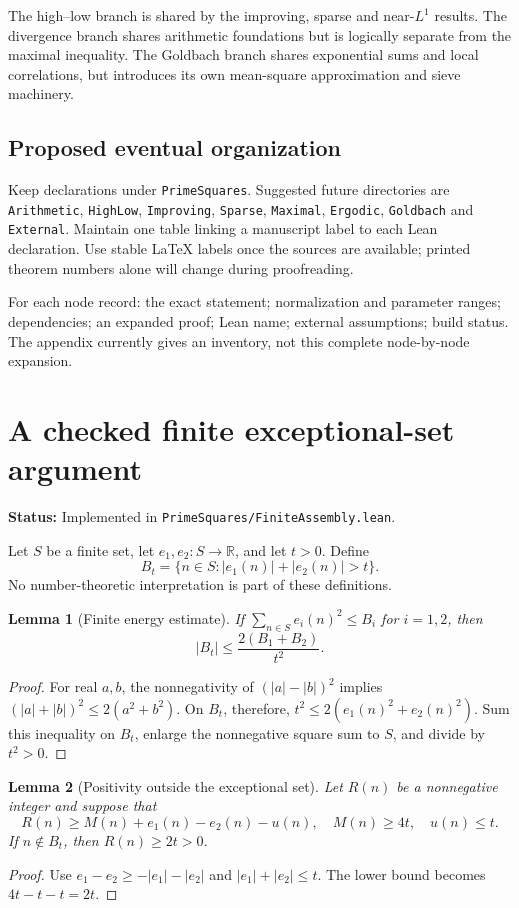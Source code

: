 \documentclass[11pt]{article}
\newcommand{\R}{\mathbb R}\newcommand{\Z}{\mathbb Z}\newcommand{\N}{\mathbb N}
\newcommand{\lean}[1]{\nolinkurl{#1}}
\newcommand{\status}[1]{\textbf{Status:} #1.}
\newtheorem{lemma}{Lemma}[section]
\newcommand{\page}{\newpage}
\begin{document}
The high--low branch is shared by the improving, sparse and near-\(L^1\) results.
The divergence branch shares arithmetic foundations but is logically separate from
the maximal inequality. The Goldbach branch shares exponential sums and local
correlations, but introduces its own mean-square approximation and sieve machinery.

\subsection*{Proposed eventual organization}
Keep declarations under \lean{PrimeSquares}. Suggested future directories are
\lean{Arithmetic}, \lean{HighLow}, \lean{Improving}, \lean{Sparse},
\lean{Maximal}, \lean{Ergodic}, \lean{Goldbach} and \lean{External}.
Maintain one table linking a manuscript label to each Lean declaration. Use stable
LaTeX labels once the sources are available; printed theorem numbers alone will
change during proofreading.

For each node record: the exact statement; normalization and parameter ranges;
dependencies; an expanded proof; Lean name; external assumptions; build status.
The appendix currently gives an inventory, not this complete node-by-node expansion.

\page
\section{A checked finite exceptional-set argument}
\status{Implemented in \lean{PrimeSquares/FiniteAssembly.lean}}

Let \(S\) be a finite set, let \(e_1,e_2:S\to\R\), and let \(t>0\). Define
\[
 B_t=\{n\in S:|e_1(n)|+|e_2(n)|>t\}.
\]
No number-theoretic interpretation is part of these definitions.

\begin{lemma}[Finite energy estimate]
If \(\sum_{n\in S}e_i(n)^2\le B_i\) for \(i=1,2\), then
\[
 |B_t|\le\frac{2(B_1+B_2)}{t^2}.
\]
\end{lemma}
\begin{proof}
For real \(a,b\), the nonnegativity of \((|a|-|b|)^2\) implies
\((|a|+|b|)^2\le2(a^2+b^2)\). On \(B_t\), therefore,
\(t^2\le2(e_1(n)^2+e_2(n)^2)\). Sum this inequality on \(B_t\), enlarge
the nonnegative square sum to \(S\), and divide by \(t^2>0\).
\end{proof}

\begin{lemma}[Positivity outside the exceptional set]
Let \(R(n)\) be a nonnegative integer and suppose that
\[
 R(n)\ge M(n)+e_1(n)-e_2(n)-u(n),\quad
 M(n)\ge4t,\quad u(n)\le t.
\]
If \(n\notin B_t\), then \(R(n)\ge2t>0\).
\end{lemma}
\begin{proof}
Use \(e_1-e_2\ge-|e_1|-|e_2|\) and \(|e_1|+|e_2|\le t\). The lower
bound becomes \(4t-t-t=2t\).
\end{proof}
\end{document}
